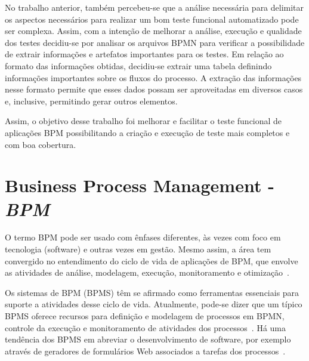 \documentclass[12pt]{article}
\begin{document}
No trabalho anterior, também percebeu-se que a análise necessária para delimitar os aspectos necessários para realizar um bom teste funcional automatizado pode ser complexa. Assim, com a intenção de melhorar a análise, execução e qualidade dos testes decidiu-se por analisar os arquivos BPMN para verificar a possibilidade de extrair informações e artefatos importantes para os testes. Em relação ao formato das informações obtidas, decidiu-se extrair uma tabela definindo informações importantes sobre os fluxos do processo. A extração das informações nesse formato permite que esses dados possam ser aproveitadas em diversos casos e, inclusive, permitindo gerar outros elementos.

Assim, o objetivo desse trabalho foi melhorar e facilitar o teste funcional de aplicações BPM possibilitando a criação e execução de teste mais completos e com boa cobertura.

\section{Business Process Management - \emph{BPM}}

O termo BPM pode ser usado com ênfases diferentes, às vezes com foco em tecnologia (software) e outras vezes em gestão. Mesmo assim, a área tem convergido no entendimento do ciclo de vida de aplicações de BPM, que envolve as atividades de análise, modelagem, execução, monitoramento e otimização~\cite{ABPMP}. 

Os sistemas de BPM (BPMS) têm se afirmado como ferramentas essenciais para suporte a atividades desse ciclo de vida. Atualmente, pode-se dizer que um típico BPMS oferece recursos para definição e modelagem de processos em BPMN, controle da execução e monitoramento de atividades dos processos~\cite{forrester}. Há uma tendência dos BPMS em abreviar o desenvolvimento de software, por exemplo através de geradores de formulários Web associados a tarefas dos processos~\cite{greenresearch}. 
\end{document}

